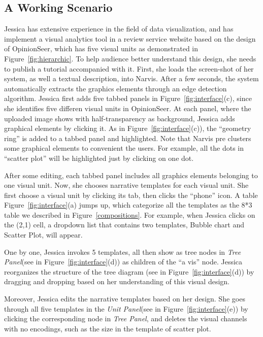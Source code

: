 \subsection{A Working Scenario}
Jessica has extensive experience in the field of data visualization, and has implement a visual analytics tool in a review service website based on the design of OpinionSeer\cite{wu_opinionseer:_2010}, which has five visual units as demonstrated in Figure~\ref{fig:hierarchic}. To help audience better understand this design, she needs to publish a tutorial accompanied with it.
First, she loads the screen-shot of her system, as well a textual description, into Narvis.
After a few seconds, the system automatically extracts the graphics elements through an edge detection algorithm. Jessica first adds five tabbed panels in Figure~\ref{fig:interface}(c), since she identifies five differen visual units in OpinionSeer. At each panel, where the uploaded image shows with half-transparency as background, Jessica adds graphical elements by clicking it. As in Figure~\ref{fig:interface}(c)), the ``geometry ring'' is added to a tabbed panel and highlighted. Note that Narvis pre clusters some graphical elements to convenient the users. For example, all the dots in ``scatter plot'' will be highlighted just by clicking on one dot. 

After some editing, each tabbed panel includes all graphics elements belonging to one visual unit. Now, she chooses narrative templates for each visual unit. 
She first choose a visual unit by clicking its tab, then clicks the ``phone'' icon. A table Figure~\ref{fig:interface}(a) jumps up, which categorize all the templates as the 8*3 table we described in Figure~\ref{compositions}. For example, when Jessica clicks on the (2,1) cell, a dropdown list that contains two templates, Bubble chart and Scatter Plot, will appear.  

One by one, Jessica invokes 5 templates, all then show as tree nodes in \textit{Tree Panel}(see in Figure~\ref{fig:interface}(d)) as children of the ``a vis'' node. Jessica reorganizes the structure of the tree diagram (see in Figure~\ref{fig:interface}(d)) by dragging and dropping based on her understanding of this visual design. 

Moreover, Jessica edits the narrative templates based on her design. 
She goes through all five templates in the \textit{Unit Panel}(see in Figure~\ref{fig:interface}(e)) by clicking the corresponding node in \textit{Tree Panel}, and deletes the visual channels with no encodings, such as the size in the template of scatter plot. 


